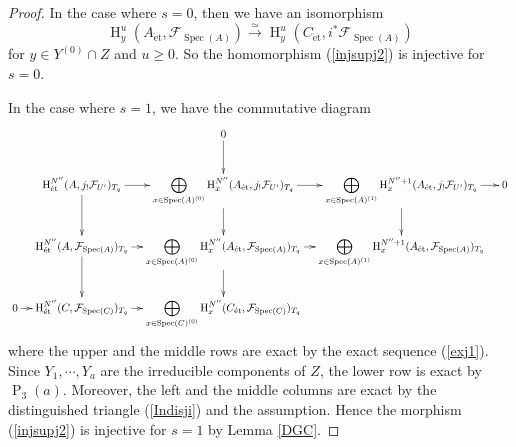 \documentclass{article}
\newcommand{\spec}{\operatorname{Spec}}
\newcommand{\et}{\mathrm{\acute{e}t}}
\newcommand{\HO}{\operatorname{H}}
\begin{document}
\begin{proof}
In the case where $s=0$, then we have an isomorphism
%
\begin{equation*}
\HO_{y}^{u}(A_{\et}, 
\mathcal{F}_{\spec(A)}
)
\xrightarrow{\simeq}   
\HO_{y}^{u}(C_{\et}, i^{*}\mathcal{F}_{\spec(A)}
)
\end{equation*}
%
for $y\in Y^{(0)}\cap Z$ and $u\geq 0$.
So the homomorphism (\ref{injsupj2}) is injective for $s=0$.

In the case where $s=1$, we have the commutative diagram
%
\fontsize{7.8pt}{7.8pt}\selectfont
\begin{equation*}
\xymatrix@C=10pt{
&
&
0\ar[d]
&
&
\\
&
\HO^{N^{\prime\prime}}_{\et}(A, j_{!}\mathcal{F}_{U^{\prime}})_{T_{q}}
\ar[r]\ar[d]
&
\displaystyle\bigoplus_{x\in \spec(A)^{(0)}}
\HO^{N^{\prime\prime}}_{x}(A_{\et}, 
j_{!}\mathcal{F}_{U^{\prime}})_{T_{q}}
\ar[r]\ar[d]
&
\displaystyle\bigoplus_{x\in \spec(A)^{(1)}}
\HO^{N^{\prime\prime}+1}_{x}(A_{\et}, 
j_{!}\mathcal{F}_{U^{\prime}})_{T_{q}}
\ar[r]\ar[d]
&
0 \\
&
\HO^{N^{\prime\prime}}_{\et}(A, \mathcal{F}_{\spec(A)})_{T_{q}}
\ar[r]\ar[d]
&
\displaystyle\bigoplus_{x\in \spec(A)^{(0)}}
\HO^{N^{\prime\prime}}_{x}(A_{\et}, \mathcal{F}_{\spec(A)})_{T_{q}}
\ar[r]\ar[d]
&
\displaystyle\bigoplus_{x\in \spec(A)^{(1)}}
\HO^{N^{\prime\prime}+1}_{x}(A_{\et}, \mathcal{F}_{\spec(A)})_{T_{q}}
\\
0\ar[r]
&
\HO^{N^{\prime\prime}}_{\et}(C, 
\mathcal{F}_{\spec(C)})_{T_{q}}
\ar[r]
&
\displaystyle\bigoplus_{x\in \spec(C)^{(0)}}
\HO^{N^{\prime\prime}}_{x}(C_{\et}, \mathcal{F}_{\spec(C)})_{T_{q}}
}    
\end{equation*}
\normalsize
%
where the upper and the middle rows are exact by
the exact
sequence (\ref{exj1}).
Since $Y_{1}, \cdots, Y_{a}$ are the irreducible components of $Z$,
the lower row is exact by
$\operatorname{P}_{3}(a)$.
Moreover, the left and the middle columns are exact
by the distinguished triangle (\ref{Indisji}) and the assumption.
Hence the morphism (\ref{injsupj2}) is injective for $s=1$ 
by Lemma \ref{DGC}.


\end{proof}
\end{document}
